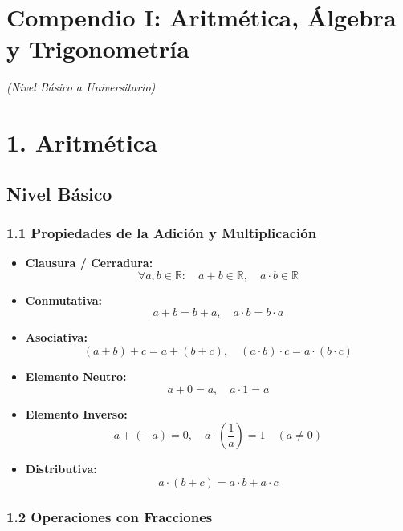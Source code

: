 \documentclass[11pt,a4paper]{article}
\begin{document}
\section*{Compendio I: Aritmética, Álgebra y Trigonometría}

\textit{(Nivel Básico a Universitario)}

\section*{1. Aritmética}

\subsection*{Nivel Básico}

\subsubsection*{1.1 Propiedades de la Adición y Multiplicación}

\begin{itemize}
  \item \textbf{Clausura / Cerradura:}
  \[
    \forall a, b \in \mathbb{R}: \quad a + b \in \mathbb{R}, \quad a \cdot b \in \mathbb{R}
  \]
  \item \textbf{Conmutativa:}
  \[
    a + b = b + a, \quad a \cdot b = b \cdot a
  \]
  \item \textbf{Asociativa:}
  \[
    (a + b) + c = a + (b + c), \quad (a \cdot b) \cdot c = a \cdot (b \cdot c)
  \]
  \item \textbf{Elemento Neutro:}
  \[
    a + 0 = a, \quad a \cdot 1 = a
  \]
  \item \textbf{Elemento Inverso:}
  \[
    a + (-a) = 0, \quad a \cdot \left(\frac{1}{a}\right) = 1 \quad (a \ne 0)
  \]
  \item \textbf{Distributiva:}
  \[
    a \cdot (b + c) = a \cdot b + a \cdot c
  \]
\end{itemize}

\subsubsection*{1.2 Operaciones con Fracciones}
\end{document}
